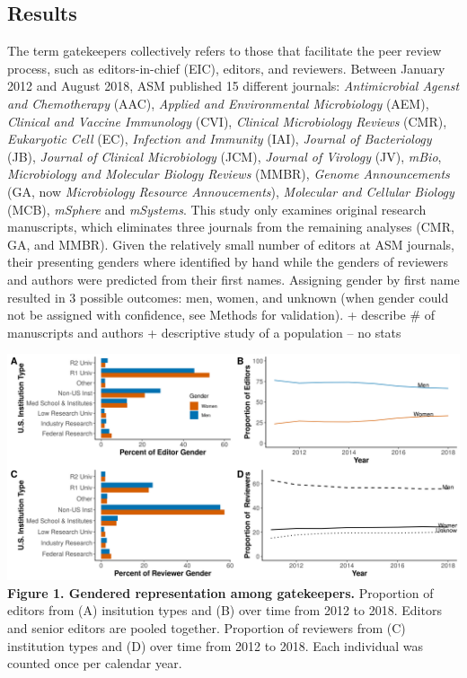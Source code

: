 \documentclass[11pt,]{article}
\begin{document}
\subsection{Results}\label{results}

The term gatekeepers collectively refers to those that facilitate the
peer review process, such as editors-in-chief (EIC), editors, and
reviewers. Between January 2012 and August 2018, ASM published 15
different journals: \emph{Antimicrobial Agenst and Chemotherapy} (AAC),
\emph{Applied and Environmental Microbiology} (AEM), \emph{Clinical and
Vaccine Immunology} (CVI), \emph{Clinical Microbiology Reviews} (CMR),
\emph{Eukaryotic Cell} (EC), \emph{Infection and Immunity} (IAI),
\emph{Journal of Bacteriology} (JB), \emph{Journal of Clinical
Microbiology} (JCM), \emph{Journal of Virology} (JV), \emph{mBio},
\emph{Microbiology and Molecular Biology Reviews} (MMBR), \emph{Genome
Announcements} (GA, now \emph{Microbiology Resource Annoucements}),
\emph{Molecular and Cellular Biology} (MCB), \emph{mSphere} and
\emph{mSystems}. This study only examines original research manuscripts,
which eliminates three journals from the remaining analyses (CMR, GA,
and MMBR). Given the relatively small number of editors at ASM journals,
their presenting genders where identified by hand while the genders of
reviewers and authors were predicted from their first names. Assigning
gender by first name resulted in 3 possible outcomes: men, women, and
unknown (when gender could not be assigned with confidence, see Methods
for validation). + describe \# of manuscripts and authors + descriptive
study of a population -- no stats

\includegraphics{Figure_1.png} \textbf{Figure 1. Gendered representation
among gatekeepers.} Proportion of editors from (A) insitution types and
(B) over time from 2012 to 2018. Editors and senior editors are pooled
together. Proportion of reviewers from (C) institution types and (D)
over time from 2012 to 2018. Each individual was counted once per
calendar year.
\end{document}
